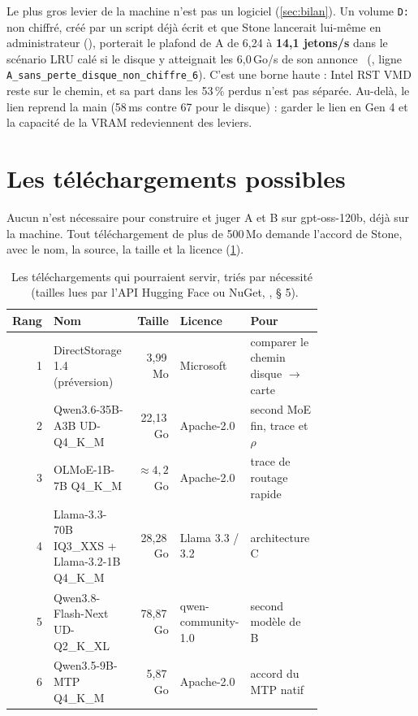 Le plus gros levier de la machine n'est pas un logiciel (\cref{sec:bilan}). Un volume \texttt{D:} non chiffré, créé par un script déjà écrit et que Stone lancerait lui-même en administrateur (), porterait le plafond de A de 6,24 à \textbf{14,1 jetons/s} dans le scénario LRU calé si le disque y atteignait les 6,0\,Go/s de son annonce \calc~(, ligne \texttt{A\_sans\_perte\_disque\_non\_chiffre\_6}). C'est une borne haute : Intel RST VMD reste sur le chemin, et sa part dans les 53\,\% perdus n'est pas séparée. Au-delà, le lien reprend la main (58\,ms contre 67 pour le disque) : garder le lien en Gen 4 et la capacité de la VRAM redeviennent des leviers.

\section{Les téléchargements possibles}\label{sec:telechargements-futurs}

Aucun n'est nécessaire pour construire et juger A et B sur gpt-oss-120b, déjà sur la machine. Tout téléchargement de plus de 500\,Mo demande l'accord de Stone, avec le nom, la source, la taille et la licence (\cref{tab:telechargements-futurs}).

\begin{table}[ht]
\centering\small
\caption[Les téléchargements qui pourraient servir]{Les téléchargements qui pourraient servir, triés par nécessité \litt~(tailles lues par l'API Hugging Face ou NuGet, , § 5).}
\label{tab:telechargements-futurs}
\begin{tabular}{@{}rp{0.34\linewidth}rp{0.15\linewidth}p{0.27\linewidth}@{}}
\toprule
Rang & Nom & Taille & Licence & Pour \\
\midrule
1 & DirectStorage 1.4 (préversion) & 3,99\,Mo & Microsoft & comparer le chemin disque $\to$ carte \\
2 & Qwen3.6-35B-A3B UD-Q4\_K\_M & 22,13\,Go & Apache-2.0 & second MoE fin, trace et $\rho$ \\
3 & OLMoE-1B-7B Q4\_K\_M & $\approx 4{,}2$\,Go & Apache-2.0 & trace de routage rapide \\
4 & Llama-3.3-70B IQ3\_XXS + Llama-3.2-1B Q4\_K\_M & 28,28\,Go & Llama 3.3 / 3.2 & architecture C \\
5 & Qwen3.8-Flash-Next UD-Q2\_K\_XL & 78,87\,Go & qwen-community-1.0 & second modèle de B \\
6 & Qwen3.5-9B-MTP Q4\_K\_M & 5,87\,Go & Apache-2.0 & accord du MTP natif \\
\bottomrule
\end{tabular}
\end{table}

